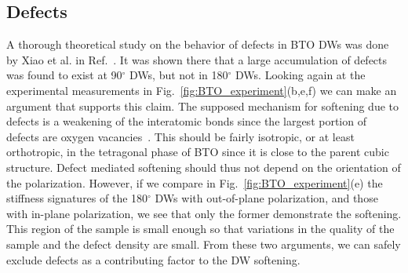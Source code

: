 \subsection{Defects}
A thorough theoretical study on the behavior of defects in BTO DWs was done by Xiao et al. in Ref.~\cite{Xiao2005}.
It was shown there that a large accumulation of defects was found to exist at 90$^\circ$ DWs, but not in 180$^\circ$ DWs.
Looking again at the experimental measurements in Fig.~\ref{fig:BTO_experiment}(b,e,f) we can make an argument that supports this claim.
The supposed mechanism for softening due to defects is a weakening of the interatomic bonds since the largest portion of defects are oxygen vacancies~\cite{Tsuji2005}.
This should be fairly isotropic, or at least orthotropic, in the tetragonal phase of BTO since it is close to the parent cubic structure.
Defect mediated softening should thus not depend on the orientation of the polarization.
However, if we compare in Fig.~\ref{fig:BTO_experiment}(e) the stiffness signatures of the 180$^\circ$ DWs with out-of-plane polarization, and those with in-plane polarization, we see that only the former demonstrate the softening.
This region of the sample is small enough so that variations in the quality of the sample and the defect density are small.
From these two arguments, we can safely exclude defects as a contributing factor to the DW softening.

